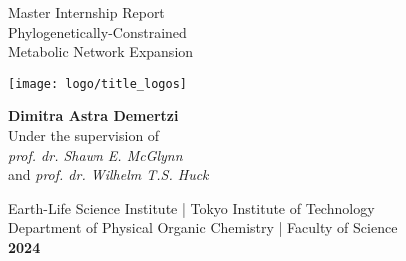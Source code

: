 \begin{titlepage}\label{sec:title}
    \begin{center}
    \thispagestyle{empty}
    
    \Large
    Master Internship Report\\
    \vspace{0.2cm}
    \huge{Phylogenetically-Constrained\\Metabolic Network Expansion}
    

    \texttt{[image: logo/title\_logos]}

    
    \vspace{0.8cm}
    \large\textbf{Dimitra Astra Demertzi}\\
    \vspace{0.2cm}
    \large Under the supervision of\\ \emph{prof. dr. Shawn E. McGlynn}\\ and \emph{prof. dr. Wilhelm T.S. Huck}
    \vspace{3cm}
    

    \normalsize
    Earth-Life Science Institute | Tokyo Institute of Technology
    \\
    Department of Physical Organic Chemistry |  Faculty of Science
    \\
    \normalsize\textbf{2024}
    
    \vfill
    \end{center}
    \end{titlepage}